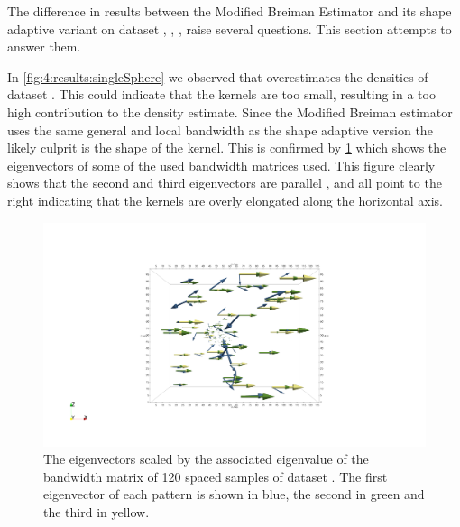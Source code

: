 
The difference in results between the Modified Breiman Estimator and its shape adaptive variant on dataset \ferdosiOne, \baakmanOne, \baakmanFour, \baakmanFive raise several questions. This section attempts to answer them.

In \cref{fig:4:results:singleSphere} we observed that \sambe overestimates the densities of dataset \ferdosiOne. This could indicate that the kernels are too small, resulting in a too high contribution to the density estimate. Since the Modified Breiman estimator uses the same general and local bandwidth as the shape adaptive version the likely culprit is the shape of the kernel. This is confirmed by \cref{fig:discussion:baakman1:eigenVectors} which shows the eigenvectors of some of the used bandwidth matrices used. This figure clearly shows that the second and third eigenvectors are parallel , and all point to the right indicating that the kernels are overly elongated along the horizontal axis. 

\begin{figure}
	\centering
	\includegraphics[width=\columnwidth, trim={950px 390px 950px 390px},clip]{5/img/baakman_1/baakman_1_eigen_vectors.png}
	\caption{The eigenvectors scaled by the associated eigenvalue of the bandwidth matrix of 120 spaced samples of dataset \baakmanOne. The first eigenvector of each pattern is shown in blue, the second in green and the third in yellow.}
	\label{fig:discussion:baakman1:eigenVectors}
\end{figure}

